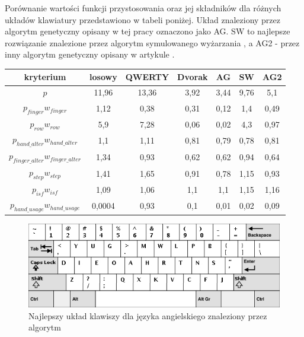 \documentclass{xmgr}
\begin{document}
Porównanie wartości funkcji przystosowania oraz jej składników dla różnych układów klawiatury przedstawiono w tabeli poniżej. Układ znaleziony przez algorytm genetyczny opisany w tej pracy oznaczono jako AG. SW to najlepsze rozwiązanie znalezione przez algorytm symulowanego wyżarzania \cite{Anderson:SimulatedAnnealing}, a AG2 - przez inny algorytm genetyczny opisany w artykule \cite{Call:2005:CME}.
\newline\newline
\begin{tabular}{ c | c | c | c | c | c | c }
  kryterium            & losowy & QWERTY & Dvorak & AG & SW   & AG2 \\
  \hline
  $p$			&  11,96 & 13,36 & 3,92 & 3,44 & 9,76 & 5,1 \\
  \hline
  $p_{finger} w_{finger}$                &   1,12 &  0,38 & 0,31 & 0,12 &  1,4 & 0,49 \\
  $p_{row} w_{row}$                      &    5,9 &  7,28 & 0,06 & 0,02 &  4,3 & 0,97 \\
  $p_{hand\_alter} w_{hand\_alter}$      &    1,1 &  1,11 & 0,81 & 0,79 & 0,78 & 0,81 \\
  $p_{finger\_alter} w_{finger\_alter}$  &   1,34 &  0,93 & 0,62 & 0,62 & 0,94 & 0,64 \\
  $p_{step} w_{step}$                    &   1,41 &  1,65 & 0,91 & 0,78 & 1,15 & 0,93 \\
  $p_{isf} w_{isf}$                      &   1,09 &  1,06 &  1,1 &  1,1 & 1,15 & 1,16 \\
  $p_{hand\_usage} w_{hand\_usage}$      & 0,0004 &  0,93 &  0,1 & 0,01 & 0,02 & 0,09 \\
\end{tabular}\newline\newline

\begin{figure}[!tbh]
\centering
\includegraphics[width=.8\hsize]{fig/best_en}
\caption{Najlepszy układ klawiszy dla języka angielskiego znaleziony przez algorytm}
\end{figure}
\end{document}
